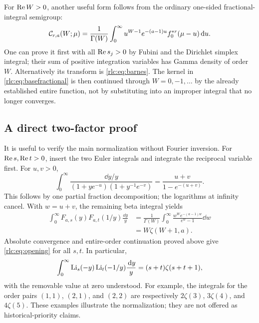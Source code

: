 For $\operatorname{Re} W>0$, another useful form follows from the ordinary
one-sided fractional-integral semigroup:
\begin{equation}\label{rlc:eq:basefractional}
 \mathcal C_{r,a}(W;\mu)=\frac1{\Gamma(W)}
 \int_0^\infty u^{W-1}e^{-(a-1)u}
           f_0^{*r}(\mu-u)\,\mathrm d u.
\end{equation}
One can prove it first with all $\operatorname{Re} s_j>0$ by Fubini and the
Dirichlet simplex integral; their sum of positive integration variables
has Gamma density of order $W$. Alternatively its transform is
\eqref{rlc:eq:barnes}. The kernel in
\eqref{rlc:eq:basefractional} is then continued through $W=0,-1,\ldots$
by the already established entire function, not by substituting into an
improper integral that no longer converges.

\subsection{A direct two-factor proof}
It is useful to verify the main normalization without Fourier inversion.
For $\operatorname{Re} s,\operatorname{Re} t>0$, insert the two Euler integrals and integrate the
reciprocal variable first. For $u,v>0$,
\[
 \int_0^\infty
 \frac{\dd y/y}{(1+ye^{-u})(1+y^{-1}e^{-v})}
 =\frac{u+v}{1-e^{-(u+v)}}.
\]
This follows by one partial fraction decomposition; the logarithms at
infinity cancel. With $w=u+v$, the remaining beta integral yields
\begin{align*}
 \int_0^\infty F_{a,s}(y)F_{a,t}(1/y)\frac{\dd y}{y}
 &=\frac1{\Gamma(W)}\int_0^\infty
       \frac{w^W e^{-(a-1)w}}{e^w-1}\dd w\\
 &=W\zeta(W+1,a).
\end{align*}
Absolute convergence and entire-order continuation proved above give
\eqref{rlc:eq:opening} for all $s,t$. In particular,
\begin{equation}\label{rlc:eq:polylogpair}
 \int_0^\infty\operatorname{Li}_s(-y)\operatorname{Li}_t(-1/y)\frac{\,\mathrm d y}{y}
     =(s+t)\zeta(s+t+1),
\end{equation}
with the removable value at zero understood. For example, the integrals
for the order pairs $(1,1)$, $(2,1)$, and $(2,2)$ are respectively
$2\zeta(3)$, $3\zeta(4)$, and $4\zeta(5)$.
These examples illustrate the normalization; they are not offered as
historical-priority claims.
